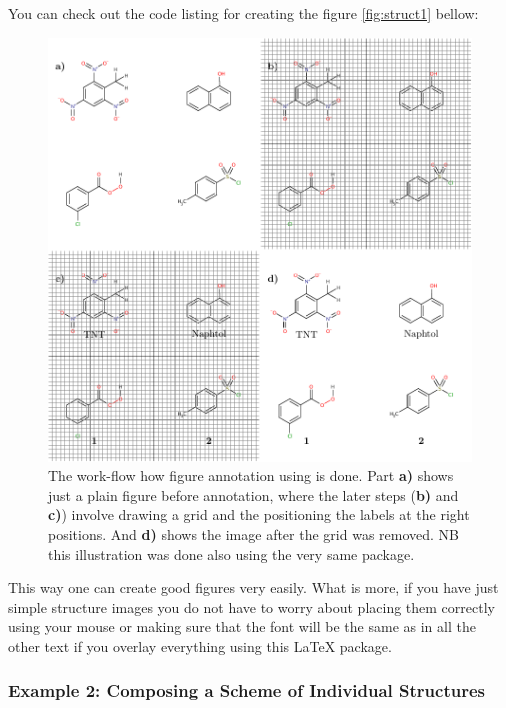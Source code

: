 \documentclass[
]{scrartcl}
\begin{document}
%
You can check out the code listing for creating the figure \ref{fig:struct1}
    bellow:
    

%
\begin{figure}[h]
    \centering
    \includegraphics{fig3-1.pdf}
    \caption{
    The work-flow how figure annotation using  is done.
    Part \textbf{a)} shows just a plain figure before annotation, where the
        later steps (\textbf{b)} and \textbf{c)}) involve drawing a grid and the
        positioning the labels at the right positions.
    And \textbf{d)} shows the image after the grid was removed.
    NB this illustration was done also using the very same  package.}
    \label{fig:struct1multi} 
\end{figure}
%
This way one can create good figures very easily.
%
What is more, if you have just simple structure images you do not have to worry
    about placing them correctly using your mouse or making sure that the font
    will be the same as in all the other text if you overlay everything using
    this \LaTeX{} package.

%
\clearpage
\subsubsection{Example 2: Composing a Scheme of Individual Structures}
\end{document}
